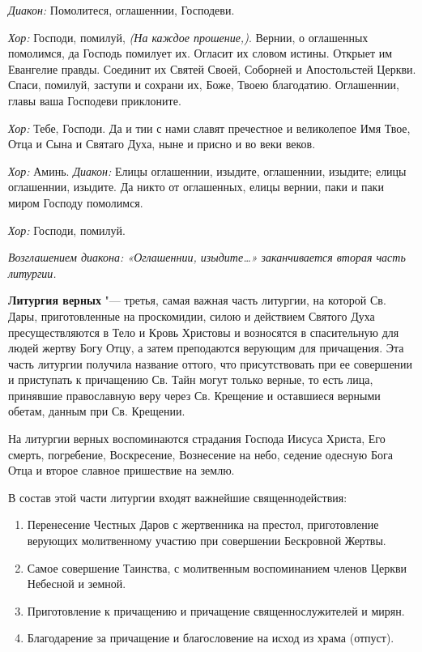 \begin{mymulticols}
{\itshape Диакон:} Помолитеся, оглашеннии, Господеви.


{\itshape Хор:} Господи, помилуй, {\itshape (На каждое прошение,)}. Вернии, о оглашенных помолимся, да Господь помилует их. Огласит их словом истины. Открыет им Евангелие правды. Соединит их Святей Своей, Соборней и Апостольстей Церкви. Спаси, помилуй, заступи и сохрани их, Боже, Твоею благодатию. Оглашеннии, главы ваша Господеви приклоните.


{\itshape Хор:} Тебе, Господи. Да и тии с нами славят пречестное и великолепое Имя Твое, Отца и Сына и Святаго Духа, ныне и присно и во веки веков.


{\itshape Хор:} Аминь. {\itshape Диакон:} Елицы оглашеннии, изыдите, оглашеннии, изыдите; елицы оглашеннии, изыдите. Да никто от оглашенных, елицы вернии, паки и паки миром Господу помолимся.


{\itshape Хор:} Господи, помилуй.


{\itshape Возглашением диакона: «Оглашеннии, изыдите…» заканчивается вторая часть литургии.}


\end{mymulticols}

\mychapterending


 


{\bfseries Литургия верных} "--- третья, самая важная часть литургии, на которой Св. Дары, приготовленные на проскомидии, силою и действием Святого Духа пресуществляются в Тело и Кровь Христовы и возносятся в спасительную для людей жертву Богу Отцу, а затем преподаются верующим для причащения. Эта часть литургии получила название оттого, что присутствовать при ее совершении и приступать к причащению Св. Тайн могут только верные, то есть лица, принявшие православную веру через Св. Крещение и оставшиеся верными обетам, данным при Св. Крещении.



  На литургии верных воспоминаются страдания Господа Иисуса Христа, Его смерть, погребение, Воскресение, Вознесение на небо, седение одесную Бога Отца и второе славное пришествие на землю.


В состав этой части литургии входят важнейшие священнодействия:
\begin{enumerate}

\item Перенесение Честных Даров с жертвенника на престол, приготовление верующих молитвенному участию при совершении Бескровной Жертвы.


\item Самое совершение Таинства, с молитвенным воспоминанием членов Церкви Небесной и земной. 


\item Приготовление к причащению и причащение священнослужителей и мирян.


\item Благодарение за причащение и благословение на исход из храма (отпуст).

\end{enumerate}

